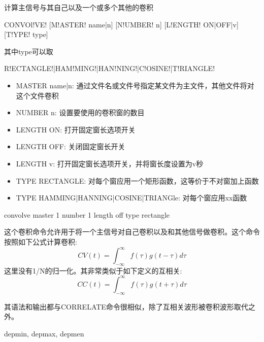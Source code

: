 \label{cmd:convolve}

计算主信号与其自己以及一个或多个其他的卷积

\begin{SACSTX}
CONVOl!VE! [M!ASTER! name|n] [N!UMBER! n] [L!ENGTH! ON|OFF|v] [T!YPE! type]
\end{SACSTX}
其中type可以取
\begin{SACSTX}
R!ECTANGLE!|HAM!MING!|HAN!NING!|C!OSINE!|T!RIANGLE!
\end{SACSTX}

\begin{itemize}
\item MASTER name|n: 通过文件名或文件号指定某文件为主文件，其他文件将对这个文件卷积
\item NUMBER n: 设置要使用的卷积窗的数目
\item LENGTH ON: 打开固定窗长选项开关
\item LENGTH OFF: 关闭固定窗长开关
\item LENGTH v: 打开固定窗长选项开关，并将窗长度设置为v秒
\item TYPE RECTANGLE: 对每个窗应用一个矩形函数，这等价于不对窗加上函数
\item TYPE HAMMING|HANNING|COSINE|TRIANGle: 对每个窗应用xx函数
\end{itemize}

\begin{SACDFT}
convolve master 1 number 1 length off type rectangle
\end{SACDFT}

这个卷积命令允许用于将一个主信号对自己卷积以及和其他信号做卷积。这个命令按照如下公式计算卷积:
	\[ CV(t) = \int_{-\infty} ^\infty f(\tau)g(t-\tau)d\tau \]
这里没有1/N的归一化。其非常类似于如下定义的互相关:
	\[ CC(t) = \int_{-\infty} ^\infty f(\tau)g(t+\tau)d\tau \]
	
其语法和输出都与CORRELATE命令很相似，除了互相关波形被卷积波形取代之外。

depmin, depmax, depmen
